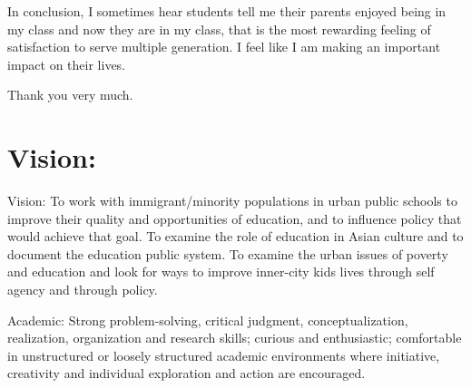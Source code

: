 \documentclass[
]{book}
\begin{document}
In conclusion, I sometimes hear students tell me their parents enjoyed being in my class and now they are in my class, that is the most rewarding feeling of satisfaction to serve multiple generation. I feel like I am making an important impact on their lives.

Thank you very much.

\chapter{Vision:}\label{vision}

Vision:
To work with immigrant/minority populations in urban public schools to improve their quality and opportunities of education, and to influence policy that would achieve that goal. To examine the role of education in Asian culture and to document the education public system. To examine the urban issues of poverty and education and look for ways to improve inner-city kids lives through self agency and through policy.

Academic: Strong problem-solving, critical judgment, conceptualization, realization, organization and research skills; curious and enthusiastic; comfortable in unstructured or loosely structured academic environments where initiative, creativity and individual exploration and action are encouraged.
\end{document}
